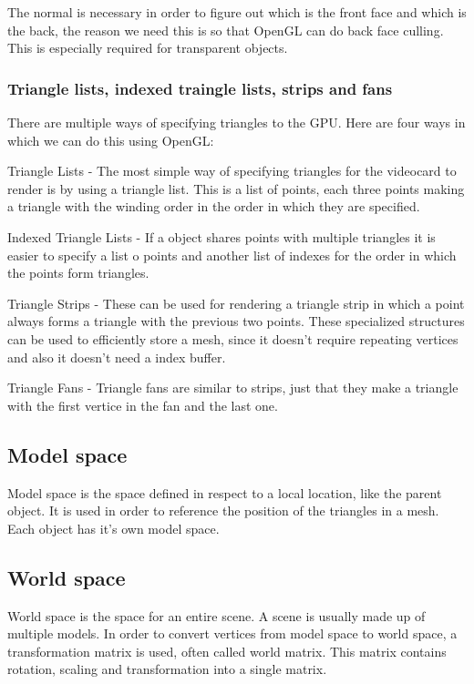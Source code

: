 The normal is necessary in order to figure out which is the front face and which is the back, the reason we need this is so that OpenGL can do back face culling. This is especially required for transparent objects.

\subsubsection{Triangle lists, indexed traingle lists, strips and fans}

There are multiple ways of specifying triangles to the GPU. Here are four ways in which we can do this using OpenGL:

\textbullet Triangle Lists - The most simple way of specifying triangles for the videocard to render is by using a triangle list. This is a list of points, each three points making a triangle with the winding order in the order in which they are specified.

\textbullet Indexed Triangle Lists -  If a object shares points with multiple triangles it is easier to specify a list o points and another list of indexes for the order in which the points form triangles.

\textbullet Triangle Strips - These can be used for rendering a triangle strip in which a point always forms a triangle with the previous two points. These specialized structures can be used to efficiently store a mesh, since it doesn’t require repeating vertices and also it doesn’t need a index buffer.

\textbullet Triangle Fans - Triangle fans are similar to strips, just that they make a triangle with the first vertice in the fan and the last one.

\subsection{Model space}

Model space is the space defined in respect to a local location, like the parent object. It is used in order to reference the position of the triangles in a mesh. Each object has it’s own model space.

\subsection{World space}

World space is the space for an entire scene. A scene is usually made up of multiple models. In order to convert vertices from model space to world space, a transformation matrix is used, often called world matrix. This matrix contains rotation, scaling and transformation into a single matrix.

